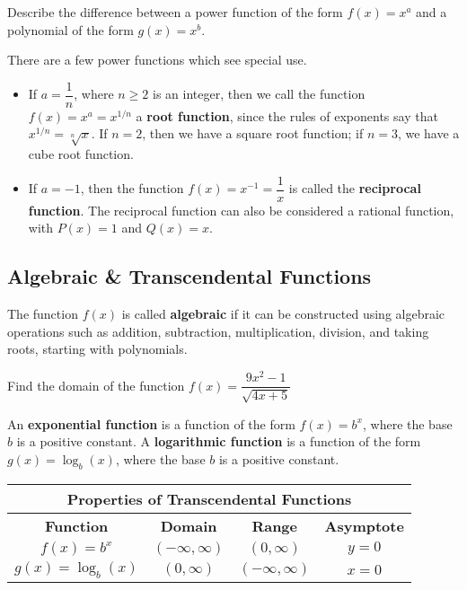\documentclass[notes]{subfiles}
\begin{document}
		\begin{question}
			Describe the difference between a power function of the form \(f(x) = x^a\) and a polynomial of the form \(g(x) = x^b\).
		\end{question}
			
		\begin{rmk}
			There are a few power functions which see special use.
			\begin{itemize}
				\item If \(a = \dfrac{1}{n}\), where \(n \geq 2\) is an integer, then we call the function \(f(x) = x^a = x^{1/n}\) a \textbf{root function}, since the rules of exponents say that \(x^{1/n} = \sqrt[n]{x}\). If \(n = 2\), then we have a square root function; if \(n = 3\), we have a cube root function.
				\item If \(a = -1\), then the function \(f(x) = x^{-1} = \dfrac{1}{x}\) is called the \textbf{reciprocal function}. The reciprocal function can also be considered a rational function, with \(P(x) = 1\) and \(Q(x) = x\).
			\end{itemize}
		\end{rmk}
		
		
	\subsection*{Algebraic \& Transcendental Functions}
		\begin{defn}
			The function \(f(x)\) is called \textbf{algebraic} if it can be constructed using algebraic operations such as addition, subtraction, multiplication, division, and taking roots, starting with polynomials.
		\end{defn}
			\newpage
			
		\begin{ex}
			Find the domain of the function \(f(x) = \dfrac{9x^2 -1}{\sqrt{4x + 5}}\)
		\end{ex}
			
		\begin{defn}
			An \textbf{exponential function} is a function of the form \(f(x) = b^x\), where the base \(b\) is a positive constant. A \textbf{logarithmic function} is a function of the form \(g(x) = \log_b (x)\), where the base \(b\) is a positive constant.
		\end{defn}
		
		\begin{center}
			\setlength{\arrayrulewidth}{1.5pt}
			\renewcommand{\arraystretch}{1.5}
			\begin{tabular}{|c|c|c|c|}\hline
				\multicolumn{4}{|c|}{\textbf{Properties of Transcendental Functions}}\\ \hline
				\textbf{Function} & \textbf{Domain} & \textbf{Range} & \textbf{Asymptote} \\ \hline
				\(f(x) = b^x\) & \((-\infty,\infty)\) & \((0,\infty)\) & \(y = 0\) \\ \hline
				\(g(x) = \log_b (x)\) & \((0,\infty)\) & \((-\infty,\infty)\) & \(x = 0\) \\ \hline
			\end{tabular}
		\end{center}
		
\end{document}
